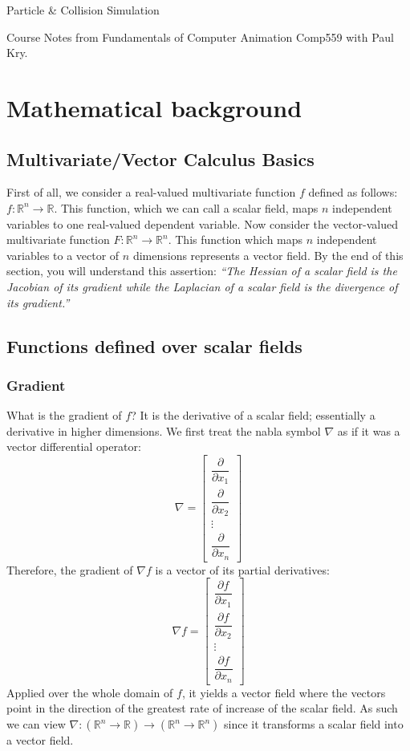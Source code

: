 \documentclass{article}
\begin{document}
\renewcommand{\arraystretch}{1.9}
\centerline{\sc \large Particle \& Collision Simulation}
\centerline{Course Notes from Fundamentals of Computer Animation Comp559 with Paul Kry.}

\section{Mathematical background}
\subsection{Multivariate/Vector Calculus Basics} First of all, we consider a
real-valued multivariate function $f$ defined as follows: $f:\mathbb{R}^n
\longrightarrow \mathbb{R}$. This function, which we can call a scalar field,
maps $n$ independent variables to one real-valued dependent variable. Now
consider the vector-valued multivariate function $F:\mathbb{R}^n \longrightarrow
\mathbb{R}^n$. This function which maps $n$ independent variables to a vector of
$n$ dimensions represents a vector field. By the end of this section, you will
understand this assertion: \textit{``The Hessian of a scalar field is the
Jacobian of its gradient while the Laplacian of a scalar field is the divergence
of its gradient.''}
\subsection{Functions defined over scalar fields}
\subsubsection{Gradient}
What is the gradient of $f$? It is the derivative of a scalar field; essentially
a derivative in higher dimensions. We first treat the nabla symbol $\nabla$ as
if it was a vector differential operator: 
\[
\nabla = 
\begin{bmatrix}
    \dfrac{\partial }{\partial x_1} \\
    \dfrac{\partial }{\partial x_2} \\
    \vdots \\
    \dfrac{\partial }{\partial x_n}
\end{bmatrix}
\]
Therefore, the gradient of $\nabla f$ is a vector of its partial derivatives:
\[
\nabla f = 
\begin{bmatrix}
    \dfrac{\partial f}{\partial x_1} \\
    \dfrac{\partial f}{\partial x_2} \\
    \vdots \\
    \dfrac{\partial f}{\partial x_n}
\end{bmatrix}
\]
Applied over the whole domain of $f$, it yields a vector field where the vectors
point in the direction of the greatest rate of increase of the scalar field. As
such we can view $\nabla : (\mathbb{R}^n \rightarrow \mathbb{R})
\longrightarrow (\mathbb{R}^n \rightarrow \mathbb{R}^n) $ since it transforms a
scalar field into a vector field.
\end{document}
